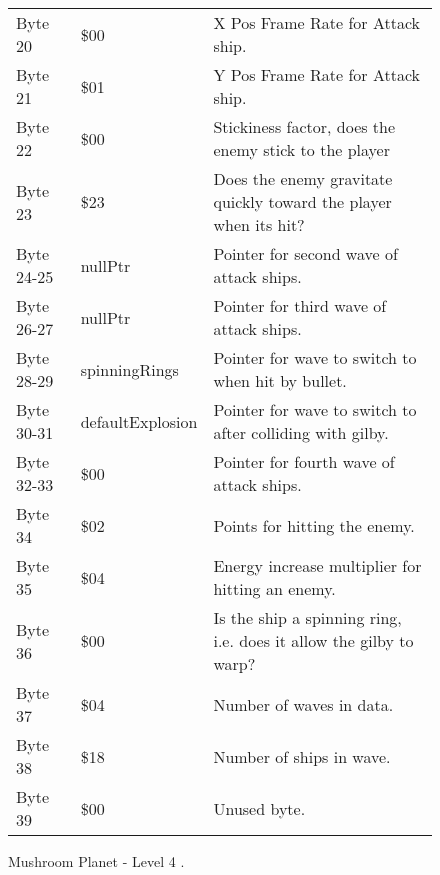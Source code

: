 \begin{figure}[H]
{\begin{adjustbox}{width=12cm}
\begin{tabular}{lll}
 Byte 20    & \$00                       & X Pos Frame Rate for Attack ship.                                   \\
 Byte 21    & \$01                       & Y Pos Frame Rate for Attack ship.                                   \\
 Byte 22    & \$00                       & Stickiness factor, does the enemy stick to the player               \\
 Byte 23    & \$23                       & Does the enemy gravitate quickly toward the player when its hit?    \\
 Byte 24-25 & nullPtr                   & Pointer for second wave of attack ships.                            \\
 Byte 26-27 & nullPtr                   & Pointer for third wave of attack ships.                             \\
 Byte 28-29 & spinningRings             & Pointer for wave to switch to when hit by bullet.                   \\
 Byte 30-31 & defaultExplosion          & Pointer for  wave to switch to after colliding with gilby.          \\
 Byte 32-33 & \$00                       & Pointer for fourth wave of attack ships.                            \\
 Byte 34    & \$02                       & Points for hitting the enemy.                                       \\
 Byte 35    & \$04                       & Energy increase multiplier for hitting an enemy.                    \\
 Byte 36    & \$00                       & Is the ship a spinning ring, i.e. does it allow the gilby to warp?  \\
 Byte 37    & \$04                       & Number of waves in data.                                            \\
 Byte 38    & \$18                       & Number of ships in wave.                                            \\
 Byte 39    & \$00                       & Unused byte.                                                        \\
\bottomrule
\end{tabular}

  \end{adjustbox}

  }\caption*{Mushroom Planet - Level 4
.}
\end{figure}

